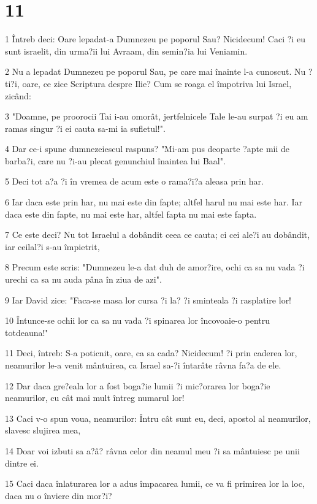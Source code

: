 \chapter{11}

\par 1 Întreb deci: Oare lepadat-a Dumnezeu pe poporul Sau? Nicidecum! Caci ?i eu sunt israelit, din urma?ii lui Avraam, din semin?ia lui Veniamin.
\par 2 Nu a lepadat Dumnezeu pe poporul Sau, pe care mai înainte l-a cunoscut. Nu ?ti?i, oare, ce zice Scriptura despre Ilie? Cum se roaga el împotriva lui Israel, zicând:
\par 3 "Doamne, pe proorocii Tai i-au omorât, jertfelnicele Tale le-au surpat ?i eu am ramas singur ?i ei cauta sa-mi ia sufletul!".
\par 4 Dar ce-i spune dumnezeiescul raspuns? "Mi-am pus deoparte ?apte mii de barba?i, care nu ?i-au plecat genunchiul înaintea lui Baal".
\par 5 Deci tot a?a ?i în vremea de acum este o rama?i?a aleasa prin har.
\par 6 Iar daca este prin har, nu mai este din fapte; altfel harul nu mai este har. Iar daca este din fapte, nu mai este har, altfel fapta nu mai este fapta.
\par 7 Ce este deci? Nu tot Israelul a dobândit ceea ce cauta; ci cei ale?i au dobândit, iar ceilal?i s-au împietrit,
\par 8 Precum este scris: "Dumnezeu le-a dat duh de amor?ire, ochi ca sa nu vada ?i urechi ca sa nu auda pâna în ziua de azi".
\par 9 Iar David zice: "Faca-se masa lor cursa ?i la? ?i sminteala ?i rasplatire lor!
\par 10 Întunce-se ochii lor ca sa nu vada ?i spinarea lor încovoaie-o pentru totdeauna!"
\par 11 Deci, întreb: S-a poticnit, oare, ca sa cada? Nicidecum! ?i prin caderea lor, neamurilor le-a venit mântuirea, ca Israel sa-?i întarâte râvna fa?a de ele.
\par 12 Dar daca gre?eala lor a fost boga?ie lumii ?i mic?orarea lor boga?ie neamurilor, cu cât mai mult întreg numarul lor!
\par 13 Caci v-o spun voua, neamurilor: Întru cât sunt eu, deci, apostol al neamurilor, slavesc slujirea mea,
\par 14 Doar voi izbuti sa a?â? râvna celor din neamul meu ?i sa mântuiesc pe unii dintre ei.
\par 15 Caci daca înlaturarea lor a adus împacarea lumii, ce va fi primirea lor la loc, daca nu o înviere din mor?i?
